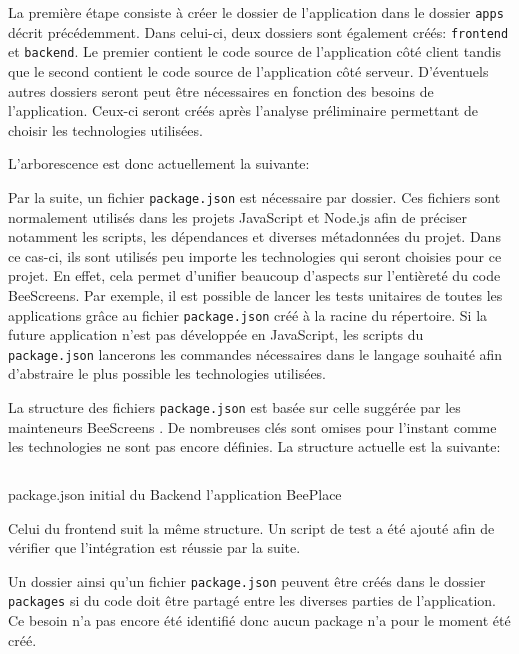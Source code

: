 La première étape consiste à créer le dossier de l'application dans le dossier \texttt{apps} décrit précédemment. Dans celui-ci, deux dossiers sont également créés: \texttt{frontend} et \texttt{backend}. Le premier contient le code source de l'application côté client tandis que le second contient le code source de l'application côté serveur. D'éventuels autres dossiers seront peut être nécessaires en fonction des besoins de l'application. Ceux-ci seront créés après l'analyse préliminaire permettant de choisir les technologies utilisées.

L'arborescence est donc actuellement la suivante:


Par la suite, un fichier \texttt{package.json} est nécessaire par dossier. Ces fichiers sont normalement utilisés dans les projets JavaScript et Node.js afin de préciser notamment les scripts, les dépendances et diverses métadonnées du projet. Dans ce cas-ci, ils sont utilisés peu importe les technologies qui seront choisies pour ce projet. En effet, cela permet d'unifier beaucoup d'aspects sur l'entièreté du code BeeScreens. Par exemple, il est possible de lancer les tests unitaires de toutes les applications grâce au fichier \texttt{package.json} créé à la racine du répertoire. Si la future application n'est pas développée en JavaScript, les scripts du \texttt{package.json} lancerons les commandes nécessaires dans le langage souhaité afin d'abstraire le plus possible les technologies utilisées.

La structure des fichiers \texttt{package.json} est basée sur celle suggérée par les mainteneurs BeeScreens \cite{aboutpnpmbeescreens}. De nombreuses clés sont omises pour l'instant comme les technologies ne sont pas encore définies. La structure actuelle est la suivante:

\begin{listing}[h]
  \inputminted{json}{assets/figures/package.json}
  \caption{package.json initial du Backend l'application BeePlace}
\end{listing}

Celui du frontend suit la même structure. Un script de test a été ajouté afin de vérifier que l'intégration est réussie par la suite.

Un dossier ainsi qu'un fichier \texttt{package.json} peuvent être créés dans le dossier \texttt{packages} si du code doit être partagé entre les diverses parties de l'application. Ce besoin n'a pas encore été identifié donc aucun package n'a pour le moment été créé.

